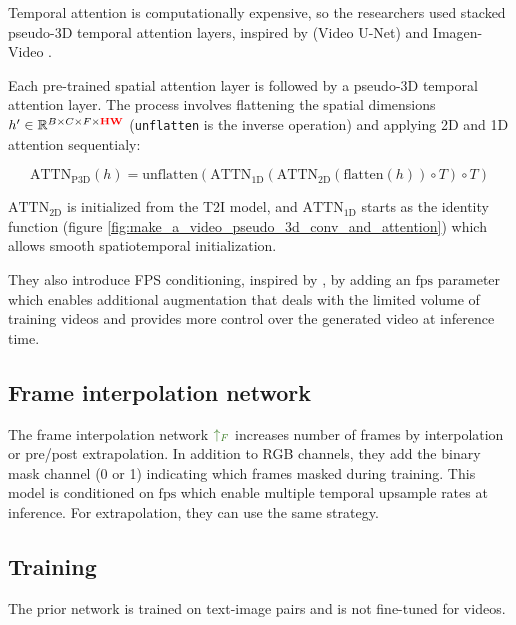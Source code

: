 Temporal attention is computationally expensive, so the researchers used stacked pseudo-3D temporal attention layers, inspired by \cite{video_diffusion_models} (Video U-Net) and Imagen-Video \cite{imagen_video}.

Each pre-trained spatial attention layer is followed by a pseudo-3D temporal attention layer. The process involves flattening the spatial dimensions $h' \in \mathbb{R}^{B\times C\times F\times \mathbf{\textcolor{red}{HW}}}$ (\texttt{unflatten} is the inverse operation) and applying 2D and 1D attention sequentialy:

\[ \text{ATTN}_{\text{P3D}} (h) = \text{unflatten} 
(\text{ATTN}_{\text{1D}} 
(\text{ATTN}_{\text{2D}} 
(\text{flatten} (h)) \circ T) \circ T) 
\]

$\text{ATTN}_\text{2D}$ is initialized from the T2I model, and $\text{ATTN}_\text{1D}$ starts as the identity function (figure \ref{fig:make_a_video_pseudo_3d_conv_and_attention}) which allows smooth spatiotemporal initialization.

They also introduce FPS conditioning, inspired by \cite{cogvideo}, by adding an $\text{fps}$ parameter which enables additional augmentation that deals with the limited volume of training videos and provides more control over the generated video at inference time.







\subsection{Frame interpolation network}

The frame interpolation network $\textcolor{OliveGreen}{\uparrow_F}$ increases number of frames by interpolation or pre/post extrapolation. In addition to RGB channels, they add the binary mask channel (0 or 1) indicating which frames masked during training. This model is conditioned on $\text{fps}$ which enable multiple temporal upsample rates at inference. For extrapolation, they can use the same strategy.






\subsection{Training}

The prior network is trained on text-image pairs and is not fine-tuned for videos.

